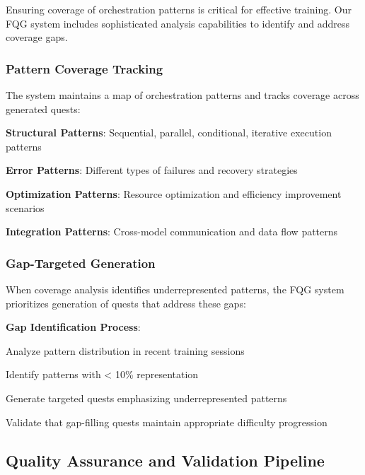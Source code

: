 Ensuring coverage of orchestration patterns is critical for effective training. Our FQG system includes sophisticated analysis capabilities to identify and address coverage gaps.

\subsubsection*{Pattern Coverage Tracking}

The system maintains a map of orchestration patterns and tracks coverage across generated quests:

\begin{compactlist}
    \item \textbf{Structural Patterns}: Sequential, parallel, conditional, iterative execution patterns
    \item \textbf{Error Patterns}: Different types of failures and recovery strategies
    \item \textbf{Optimization Patterns}: Resource optimization and efficiency improvement scenarios
    \item \textbf{Integration Patterns}: Cross-model communication and data flow patterns
\end{compactlist}

\subsubsection*{Gap-Targeted Generation}

When coverage analysis identifies underrepresented patterns, the FQG system prioritizes generation of quests that address these gaps:

\begin{successbox}
\textbf{Gap Identification Process}:
\begin{compactlist}
    \item Analyze pattern distribution in recent training sessions
    \item Identify patterns with < 10\% representation
    \item Generate targeted quests emphasizing underrepresented patterns
    \item Validate that gap-filling quests maintain appropriate difficulty progression
\end{compactlist}
\end{successbox}

\subsection*{Quality Assurance and Validation Pipeline}

